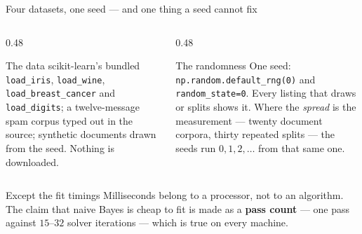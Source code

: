 \documentclass[aspectratio=169]{beamer}
\begin{document}
\begin{frame}[shrink=6]{Four datasets, one seed --- and one thing a seed cannot fix}
  \begin{columns}[T]
    \begin{column}{0.48\textwidth}
      \begin{block}{The data}
        \small scikit-learn's bundled \texttt{load\_iris},
        \texttt{load\_wine}, \texttt{load\_breast\_cancer} and
        \texttt{load\_digits}; a twelve-message spam corpus typed out in the
        source; synthetic documents drawn from the seed. Nothing is
        downloaded.
      \end{block}
    \end{column}
    \begin{column}{0.48\textwidth}
      \begin{block}{The randomness}
        \small One seed: \texttt{np.random.default\_rng(0)} and
        \texttt{random\_state=0}. Every listing that draws or splits shows
        it. Where the \emph{spread} is the measurement --- twenty document
        corpora, thirty repeated splits --- the seeds run $0, 1, 2, \dots$
        from that same one.
      \end{block}
    \end{column}
  \end{columns}
  \vspace{0.3em}
  \begin{alertblock}{Except the fit timings}
    \centering\footnotesize
    Milliseconds belong to a processor, not to an algorithm. The claim that
    naive Bayes is cheap to fit is made as a \textbf{pass count} --- one pass
    against $15$--$32$ solver iterations --- which is true on every machine.
  \end{alertblock}
\end{frame}
\end{document}
